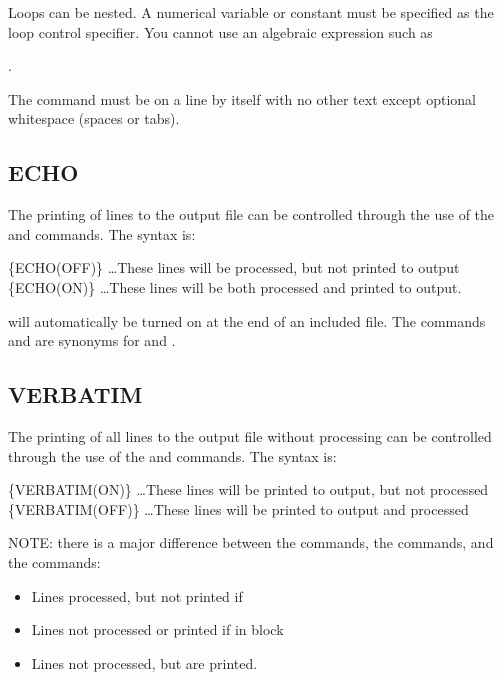 Loops can be nested. A numerical variable or constant must be specified as the
loop control specifier. You cannot use an algebraic expression such as

.

The  command must be on a line by itself with no other text except optional whitespace (spaces or tabs).

\subsection{ECHO}\label{echo} The printing of lines to the output file can be controlled
through the use of the  and 
commands. The syntax is:

\begin{apinp}
\{ECHO(OFF)\}
\ldots These lines will be processed, but not printed to output
\{ECHO(ON)\}
\ldots These lines will be both processed and printed to output.
\end{apinp}

 will automatically be turned on at the end of an included file. The
commands  and  are synonyms for  and .

\subsection{VERBATIM} The printing of all lines to the output file without processing
can be controlled through the use of the  and 
commands. The syntax is:

\begin{apinp}
\{VERBATIM(ON)\}
\ldots These lines will be printed to output, but not processed
\{VERBATIM(OFF)\}
\ldots These lines will be printed to output and processed
\end{apinp}
NOTE:  there  is  a  major  difference  between  the   commands,
the commands, and the  commands:

\begin{itemize}
\item {} Lines processed, but not printed if 
\item {} Lines not processed or printed if in  block
\item {} Lines not processed, but are printed.
\end{itemize}

